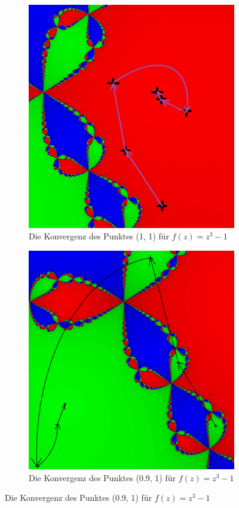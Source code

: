 \documentclass[a4paper,12pt]{llncs}
\numberwithin{equation}{section}
\begin{document}
\begin{figure}[ht]   
	\begin{subfigure}{.5\textwidth}
		\centering
		\includegraphics[width=.7\linewidth]{figures/output_points3}
		\captionsetup{width=0.8\textwidth}
		\caption{Die Konvergenz des Punktes (1, 1) für $f(z)=z^3-1$ }
		\label{fig:output_points3}
	\end{subfigure}%
	\begin{subfigure}{.5\textwidth}
		\centering
		\includegraphics[width=.7\linewidth]{figures/output_points_g3}
		\captionsetup{width=0.8\textwidth}
		\caption{Die Konvergenz des Punktes (0.9, 1) für $f(z)=z^3-1$ }
		\label{fig:output_points_g3}
	\end{subfigure}%
\end{figure}
\end{document}
